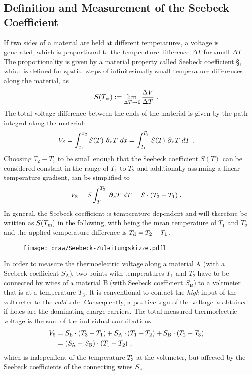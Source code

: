 \subsection{Definition and Measurement of the Seebeck Coefficient}\label{sec:TheoSeeDefAndMeas}
If two sides of a material are held at different temperatures, a voltage \V is generated, which is proportional to the temperature difference $\Delta T$ for small $\Delta T$. The proportionality is given by a material property called Seebeck coefficient \S, which is defined for spatial steps of infinitesimally small temperature differences along the material, as
\begin{equation}
 \S(\Tm) := \lim_{\Delta T\to0} \frac{\Delta \V}{\Delta T}
\label{eq:DefSeebeck}
 \PUNKT
\end{equation}
The total voltage difference \Vs between the ends of the material is given by the path integral along the material\cite{WagnerDiss2007}:
\begin{equation}
\Vs = \int_{x_1}^{x_2} S(T) ~ \partial_x T ~ dx
= \int_{T_1}^{T_2} S(T) ~ \partial_x T ~ dT
\label{eq:DefVs}%
\PUNKT
\end{equation}
Choosing $T_2-T_1$ to be small enough that the Seebeck coefficient $S(T)$ can be considered constant in the range of $T_1$ to $T_2$ and additionally assuming a linear temperature gradient, \lasteqn can be simplified to
\begin{equation}
\Vs = \S \int_{T_1}^{T_2} ~ \partial_x T ~ dT = \S \cdot (T_2-T_1)
\PUNKT
\end{equation}
In general, the Seebeck coefficient is temperature-dependent and will therefore be written as $\S(\Tm)$ in the following, with \Tm being the mean temperature of $T_1$ and $T_2$ and the applied temperature difference is $T_\text{d}=T_2-T_1$.

\begin{wrapfigure}[4]{r}[0mm]{21mm}%
{\vspace*{-1.5em}\texttt{[image: draw/Seebeck-Zuleitungskizze.pdf]}}%
\end{wrapfigure}%
In order to measure the thermoelectric voltage \Vs along a material A (with a Seebeck coefficient $S_\text{A}$), two points with temperatures $T_1$ and $T_2$ have to be connected by wires of a material B (with Seebeck coefficient $S_\text{B}$) to a voltmeter that is at a temperature $T_3$. It is conventional to contact the \emph{high} input of the voltmeter to the \emph{cold} side. Consequently, a positive sign of the voltage is obtained if holes are the dominating charge carriers.
The total measured thermoelectric voltage is the sum of the individual contributions:
\begin{align}
V_\text{S} &= S_\text{B} \cdot (T_3-T_1) + S_\text{A} \cdot (T_1-T_2) + S_\text{B} \cdot (T_2-T_3) \nonumber\\
&= (S_\text{A}-S_\text{B}) \cdot (T_1-T_2)
~,
\end{align}
which is independent of the temperature $T_3$ at the voltmeter, but affected by the Seebeck coefficients of the connecting wires $S_\text{B}$.

